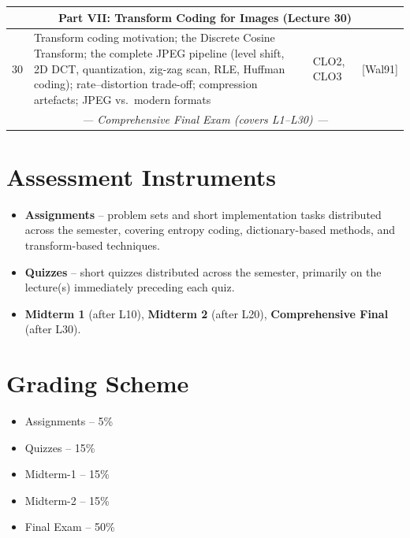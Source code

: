 \documentclass{article}
\begin{document}
\begin{longtable}{|c|p{8.7cm}|p{1.6cm}|p{2.6cm}|}
\multicolumn{4}{|c|}{\cellcolor{gray!20}\textbf{Part VII: Transform Coding for Images (Lecture 30)}} \\ \hline
30 & Transform coding motivation; the Discrete Cosine Transform; the complete JPEG pipeline (level shift, 2D DCT, quantization, zig-zag scan, RLE, Huffman coding); rate--distortion trade-off; compression artefacts; JPEG vs.\ modern formats & CLO2, CLO3 & [Wal91] \\ \hline
\multicolumn{4}{|c|}{\cellcolor{yellow!25}\textit{--- Comprehensive Final Exam (covers L1--L30) ---}} \\ \hline
\end{longtable}

\normalsize

\section*{Assessment Instruments}
\begin{itemize}
    \item \textbf{Assignments} -- problem sets and short implementation tasks distributed across the semester, covering entropy coding, dictionary-based methods, and transform-based techniques.
    \item \textbf{Quizzes} -- short quizzes distributed across the semester, primarily on the lecture(s) immediately preceding each quiz.
    \item \textbf{Midterm 1} (after L10), \textbf{Midterm 2} (after L20), \textbf{Comprehensive Final} (after L30).
\end{itemize}

\section*{Grading Scheme}
\begin{itemize}
    \item Assignments -- 5\%
    \item Quizzes -- 15\%
    \item Midterm-1 -- 15\%
    \item Midterm-2 -- 15\%
    \item Final Exam -- 50\%
\end{itemize}
\end{document}
